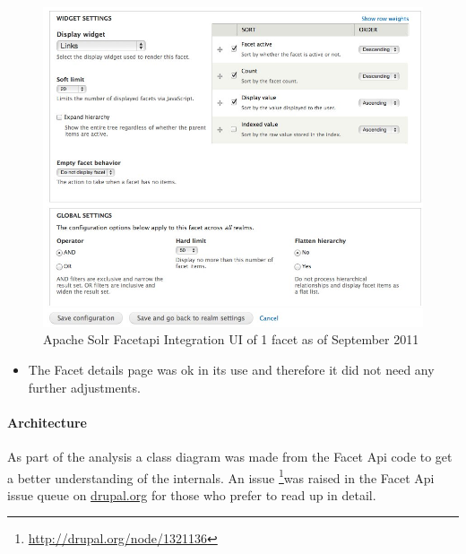 \begin{figure}[H]
     \includegraphics[width=\textwidth]{images/facetapi_ui_facet_september_2011.jpg}
     \caption{Apache Solr Facetapi Integration UI of 1 facet as of September 2011}
\end{figure}
\begin{itemize}
\item The Facet details page was ok in its use and therefore it did not need any further adjustments.
\end{itemize}

\paragraph{Architecture}
As part of the analysis a class diagram was made from the Facet Api code to get a better understanding of the internals. An issue \footnote{\url{http://drupal.org/node/1321136}}was raised in the Facet Api issue queue on \url{drupal.org} for those who prefer to read up in detail.


